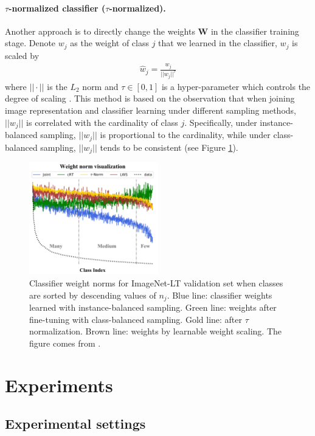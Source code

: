 \documentclass{article}
\begin{document}
\paragraph{$\tau$-normalized classifier ($\tau$-normalized).}Another approach is to directly change the weights $\mathbf{W}$ in the classifier training stage. Denote $w_j$ as the weight of class $j$ that we learned in the classifier, $w_j$ is scaled by
\begin{align}
    \hat{w}_j=\frac{w_j}{||w_j||^{\tau}}
\end{align}
where $||\cdot||$ is the $L_2$ norm and $\tau\in [0,1]$ is a hyper-parameter which controls the degree of scaling \cite{kang2019decoupling}. This method is based on the observation that when joining image representation and classifier learning under different sampling methods, $||w_j||$ is correlated with the cardinality of class $j$. Specifically, under instance-balanced sampling, $||w_j||$ is proportional to the cardinality, while under class-balanced sampling, $||w_j||$ tends to be consistent (see Figure \ref{fig2}).
\begin{figure}
    \centering
    \includegraphics[width=0.5\textwidth]{../img/weights_of_diff_sample.png}
    \caption{Classifier weight norms for ImageNet-LT validation set when classes are sorted by descending values of $n_j$. Blue line: classifier weights learned with instance-balanced sampling. Green line: weights after fine-tuning with class-balanced sampling. Gold line: after $\tau$ normalization. Brown line: weights by learnable weight scaling. The figure comes from \cite{kang2019decoupling}.}
    \label{fig2}
\end{figure}

\section{Experiments}

\subsection{Experimental settings}
\end{document}
